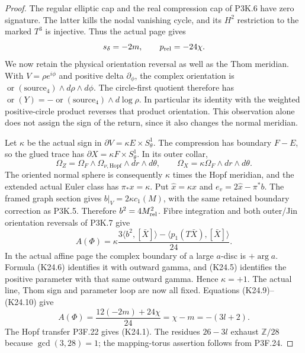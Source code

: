 \begin{proof}
The regular elliptic cap and the real compression cap of
P3K.6 have zero signature. The latter kills the nodal vanishing
cycle, and its $H^2$ restriction to the marked $T^3$ is
injective. Thus the actual page gives
\[
                 s_\delta=-2m,\qquad p_{\rm rel}=-24\chi.
\]
We now retain the physical orientation reversal as well as
the Thom meridian. With $V=\rho e^{i\phi}$ and positive
delta $\partial_\phi$, the complex orientation is
$\operatorname{or}(\text{source}_4)\wedge d\rho\wedge d\phi$.
The circle-first quotient therefore has
$\operatorname{or}(Y)=-\operatorname{or}(\text{source}_4)
\wedge d\log\rho$. In particular its identity with the
weighted positive-circle product reverses that product
orientation. This observation alone does not assign the sign
of the return, since it also changes the normal meridian.

Let $\kappa$ be the actual sign in
$\partial V=\kappa E\times S^1_\theta$. The compression
has boundary $F-E$, so the glued trace has
$\partial X=\kappa F\times S^1_\theta$. In its outer collar,
\[
 \Omega_Z=\Omega_F\wedge\Omega_{\nu,\mathrm{Hopf}}
                  \wedge dr\wedge d\theta,
 \qquad
 \Omega_X=\kappa\Omega_F\wedge dr\wedge d\theta.
\]
The oriented normal sphere is consequently $\kappa$ times
the Hopf meridian, and the extended actual Euler class has
$\pi_*x=\kappa$. Put $\widehat x=\kappa x$ and
$e_v=2\widehat x-\pi^*b$. The framed graph section gives
$b|_V=2\kappa c_1(M)$, with the same retained boundary
correction as P3K.5. Therefore $b^2=4M_{\rm rel}^2$.
Fibre integration and both outer/Jin orientation reversals
of P3K.7 give
\[
 A(\Phi)=\kappa\frac{3\langle b^2,[\bar X]\rangle
                   -\langle p_1(T\bar X),[\bar X]\rangle}{24}.
                                                               \tag{K24.10}
\]
In the actual affine page the complex boundary of a large
$a$-disc is $+\arg a$. Formula (K24.6) identifies it with
outward gamma, and (K24.5) identifies the positive parameter
with that same outward gamma. Hence $\kappa=+1$. The actual
line, Thom sign and parameter loop are now all fixed. Equations
(K24.9)--(K24.10) give
\[
 A(\Phi)=\frac{12(-2m)+24\chi}{24}
        =\chi-m=-(3l+2).
\]
The Hopf transfer P3F.22 gives (K24.1). The residues
$26-3l$ exhaust $\mathbb Z/28$ because $\gcd(3,28)=1$;
the mapping-torus assertion follows from P3F.24.


\end{proof}
